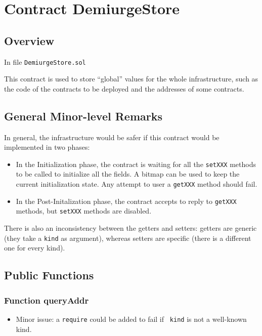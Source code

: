 
\chapter{Contract DemiurgeStore}

\minitoc

\section{Overview}

In file {\tt DemiurgeStore.sol}

This contract is used to store ``global'' values for the whole
infrastructure, such as the code of the contracts to be deployed and
the addresses of some contracts.

\section{General Minor-level Remarks}

In general, the infrastructure would be safer if this contract would
be implemented in two phases:
\begin{itemize}
\item In the Initialization phase, the contract is waiting for all the
  {\tt setXXX} methods to be called to initialize all the fields. A
  bitmap can be used to keep the current initialization state. Any
  attempt to user a {\tt getXXX} method should fail.
\item In the Post-Initalization phase, the contract accepts to reply
  to {\tt getXXX} methods, but {\tt setXXX} methods are disabled.
\end{itemize}

There is also an inconsistency between the getters and setters:
getters are generic (they take a {\tt kind} as argument), whereas
setters are specific (there is a different one for every kind).

\section{Public Functions}

\subsection{Function queryAddr}

\begin{itemize}
\item Minor issue: a {\tt require} could be added to fail if {\tt
  kind} is not a well-known kind.
\end{itemize}


